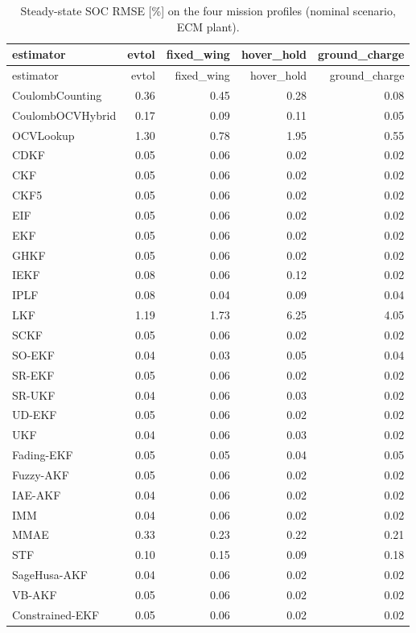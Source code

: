 \begin{longtable}{lrrrr}
\caption{Steady-state SOC RMSE [\%] on the four mission profiles (nominal scenario, ECM plant).}\label{tab:profiles}\\
\toprule estimator & evtol & fixed\_wing & hover\_hold & ground\_charge \\ \midrule\endfirsthead
\toprule estimator & evtol & fixed\_wing & hover\_hold & ground\_charge \\ \midrule\endhead
CoulombCounting & 0.36 & 0.45 & 0.28 & 0.08 \\
CoulombOCVHybrid & 0.17 & 0.09 & 0.11 & 0.05 \\
OCVLookup & 1.30 & 0.78 & 1.95 & 0.55 \\
CDKF & 0.05 & 0.06 & 0.02 & 0.02 \\
CKF & 0.05 & 0.06 & 0.02 & 0.02 \\
CKF5 & 0.05 & 0.06 & 0.02 & 0.02 \\
EIF & 0.05 & 0.06 & 0.02 & 0.02 \\
EKF & 0.05 & 0.06 & 0.02 & 0.02 \\
GHKF & 0.05 & 0.06 & 0.02 & 0.02 \\
IEKF & 0.08 & 0.06 & 0.12 & 0.02 \\
IPLF & 0.08 & 0.04 & 0.09 & 0.04 \\
LKF & 1.19 & 1.73 & 6.25 & 4.05 \\
SCKF & 0.05 & 0.06 & 0.02 & 0.02 \\
SO-EKF & 0.04 & 0.03 & 0.05 & 0.04 \\
SR-EKF & 0.05 & 0.06 & 0.02 & 0.02 \\
SR-UKF & 0.04 & 0.06 & 0.03 & 0.02 \\
UD-EKF & 0.05 & 0.06 & 0.02 & 0.02 \\
UKF & 0.04 & 0.06 & 0.03 & 0.02 \\
Fading-EKF & 0.05 & 0.05 & 0.04 & 0.05 \\
Fuzzy-AKF & 0.05 & 0.06 & 0.02 & 0.02 \\
IAE-AKF & 0.04 & 0.06 & 0.02 & 0.02 \\
IMM & 0.04 & 0.06 & 0.02 & 0.02 \\
MMAE & 0.33 & 0.23 & 0.22 & 0.21 \\
STF & 0.10 & 0.15 & 0.09 & 0.18 \\
SageHusa-AKF & 0.04 & 0.06 & 0.02 & 0.02 \\
VB-AKF & 0.05 & 0.06 & 0.02 & 0.02 \\
Constrained-EKF & 0.05 & 0.06 & 0.02 & 0.02 \\

\end{longtable}
